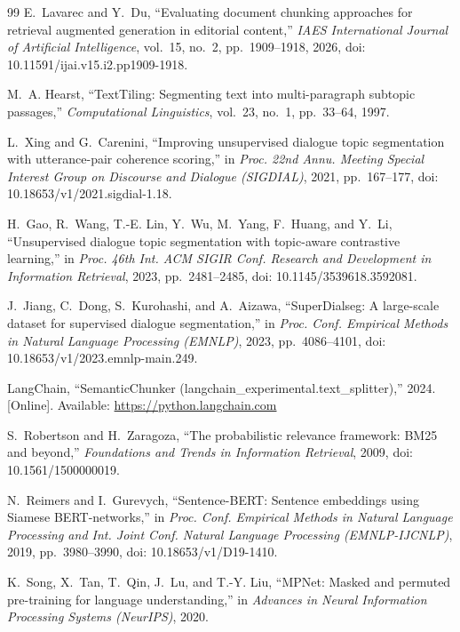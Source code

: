 \documentclass[conference]{IEEEtran}
\begin{document}
\begin{thebibliography}{99}
E.~Lavarec and Y.~Du, ``Evaluating document chunking approaches for retrieval augmented generation in editorial content,'' \emph{IAES International Journal of Artificial Intelligence}, vol.~15, no.~2, pp.~1909--1918, 2026, doi: 10.11591/ijai.v15.i2.pp1909-1918.

M.~A. Hearst, ``TextTiling: Segmenting text into multi-paragraph subtopic passages,'' \emph{Computational Linguistics}, vol.~23, no.~1, pp.~33--64, 1997.

L.~Xing and G.~Carenini, ``Improving unsupervised dialogue topic segmentation with utterance-pair coherence scoring,'' in \emph{Proc. 22nd Annu. Meeting Special Interest Group on Discourse and Dialogue (SIGDIAL)}, 2021, pp.~167--177, doi: 10.18653/v1/2021.sigdial-1.18.

H.~Gao, R.~Wang, T.-E. Lin, Y.~Wu, M.~Yang, F.~Huang, and Y.~Li, ``Unsupervised dialogue topic segmentation with topic-aware contrastive learning,'' in \emph{Proc. 46th Int. ACM SIGIR Conf. Research and Development in Information Retrieval}, 2023, pp.~2481--2485, doi: 10.1145/3539618.3592081.

J.~Jiang, C.~Dong, S.~Kurohashi, and A.~Aizawa, ``SuperDialseg: A large-scale dataset for supervised dialogue segmentation,'' in \emph{Proc. Conf. Empirical Methods in Natural Language Processing (EMNLP)}, 2023, pp.~4086--4101, doi: 10.18653/v1/2023.emnlp-main.249.

LangChain, ``SemanticChunker (langchain\_experimental.text\_splitter),'' 2024. [Online]. Available: \url{https://python.langchain.com}

S.~Robertson and H.~Zaragoza, ``The probabilistic relevance framework: BM25 and beyond,'' \emph{Foundations and Trends in Information Retrieval}, 2009, doi: 10.1561/1500000019.

N.~Reimers and I.~Gurevych, ``Sentence-BERT: Sentence embeddings using Siamese BERT-networks,'' in \emph{Proc. Conf. Empirical Methods in Natural Language Processing and Int. Joint Conf. Natural Language Processing (EMNLP-IJCNLP)}, 2019, pp.~3980--3990, doi: 10.18653/v1/D19-1410.

K.~Song, X.~Tan, T.~Qin, J.~Lu, and T.-Y. Liu, ``MPNet: Masked and permuted pre-training for language understanding,'' in \emph{Advances in Neural Information Processing Systems (NeurIPS)}, 2020.


\end{thebibliography}
\end{document}
